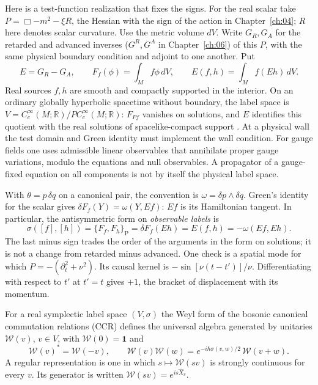 Here is a test-function realization that fixes the signs. For the real
scalar take $P=\Box-m^2-\xi R$, the Hessian with the sign of the action in
Chapter~\ref{ch:04}; $R$ here denotes scalar curvature. Use the metric
volume $dV$. Write $G_R,G_A$ for the retarded and advanced inverses
($G^R,G^A$ in Chapter~\ref{ch:06}) of this $P$, with the same physical
boundary condition and adjoint to one another. Put
\[
 E=G_R-G_A,\qquad F_f(\phi)=\int_M f\phi\,dV,\qquad
 E(f,h)=\int_M f(Eh)\,dV .
\]
Real sources $f,h$ are smooth and compactly supported in the interior. On
an ordinary globally hyperbolic spacetime without boundary, the label space
is $V=C_c^\infty(M;\mathbb R)/P C_c^\infty(M;\mathbb R)$: $F_{Pf}$
vanishes on solutions, and $E$ identifies this quotient with the real
solutions of spacelike-compact support \cite{WaldQFT}. At a physical wall
the test domain and Green identity must implement the wall condition. For
gauge fields one uses admissible linear observables that annihilate proper
gauge variations, modulo the equations and null observables. A propagator
of a gauge-fixed equation on all components is not by itself the physical
label space.

With $\theta=p\,\delta q$ on a canonical pair, the convention is
$\omega=\delta p\wedge\delta q$. Green's identity for the scalar gives
$\delta F_f(Y)=\omega(Y,Ef)$: $Ef$ is its Hamiltonian tangent. In
particular, the antisymmetric form on \emph{observable labels} is
\begin{equation}
 \sigma([f],[h])=\{F_f,F_h\}_{\mathrm P}
 =\delta F_f(Eh)=E(f,h)=-\omega(Ef,Eh).
 \label{eq:11-label-sign}
\end{equation}
The last minus sign trades the order of the arguments in the form on
solutions; it is not a change from retarded minus advanced. One check is a
spatial mode for which $P=-(\partial_t^2+\nu^2)$. Its causal kernel is
$-\sin[\nu(t-t')]/\nu$. Differentiating with respect to $t'$ at $t'=t$
gives $+1$, the bracket of displacement with its momentum.

\begin{definition}
For a real symplectic label space $(V,\sigma)$ the Weyl form of the
bosonic canonical commutation relations (CCR) defines the universal
algebra generated by unitaries $\mathcal W(v)$, $v\in V$, with
$\mathcal W(0)=\mathbf 1$ and
\begin{equation}
 \mathcal W(v)^*=\mathcal W(-v),\qquad
 \mathcal W(v)\mathcal W(w)=
 e^{-i\hbar\sigma(v,w)/2}\,\mathcal W(v+w).
 \label{eq:11-weyl}
\end{equation}
A regular representation is one in which $s\mapsto\mathcal W(sv)$ is
strongly continuous for every $v$. Its generator is written
$\mathcal W(sv)=e^{is\widehat X_v}$.
\end{definition}

